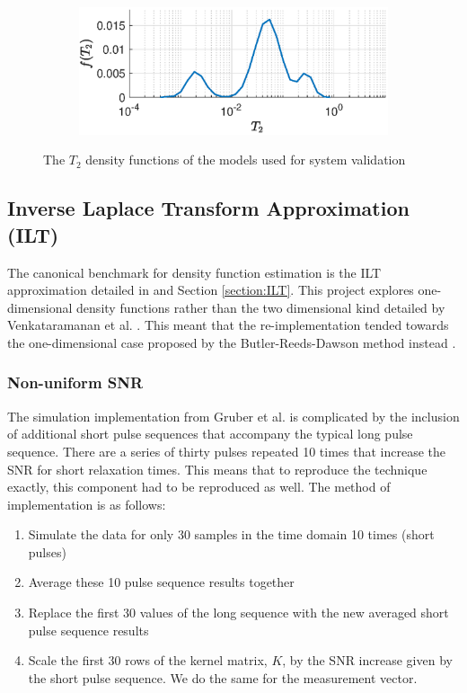 \begin{figure}[htb!]
\begin{subfigure}[b]{0.49\textwidth}
        \includegraphics[width=\textwidth]{implementation/model4.eps}
        \label{fig:model4True}
    \end{subfigure}    
    \caption{The $T_2$ density functions of the models used for system validation}
    \label{fig:T2_validation_models}
\end{figure}


\subsection{Inverse Laplace Transform Approximation (ILT)} \label{section:ILTImplementation}
The canonical benchmark for density function estimation is the ILT approximation detailed in \cite{Venk2DFredholm2002} and Section \ref{section:ILT}. This project explores one-dimensional density functions rather than the two dimensional kind detailed by Venkataramanan et al. \cite{Venk2DFredholm2002}. This meant that the re-implementation tended towards the one-dimensional case proposed by the Butler-Reeds-Dawson method instead \cite{BulterReedsDawsonMethod1981}.




\subsubsection{Non-uniform SNR}
The simulation implementation from Gruber et al. \cite{GruberT2Estimation2013} is complicated by the inclusion of additional short pulse sequences that accompany the typical long pulse sequence. There are a series of thirty pulses repeated 10 times that increase the SNR for short relaxation times. This means that to reproduce the technique exactly, this component had to be reproduced as well. The method of implementation is as follows:

\begin{enumerate}
    \item Simulate the data for only 30 samples in the time domain 10 times (short pulses)
    \item Average these 10 pulse sequence results together
    \item Replace the first 30 values of the long sequence with the new averaged short pulse sequence results
    \item Scale the first 30 rows of the kernel matrix, $K$, by the SNR increase given by the short pulse sequence. We do the same for the measurement vector.
\end{enumerate}

